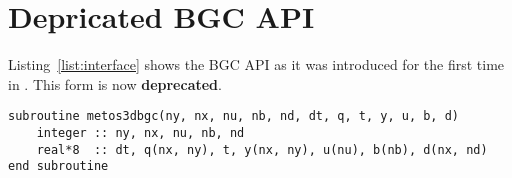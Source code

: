 \documentclass{article}
\begin{document}
%
%
%
%

%
%
%


%

\appendix

\section{Depricated BGC API}

Listing~\ref{list:interface} shows the BGC API as it was introduced
for the first time in \citep[][]{PiwSla16}. This form is now \textbf{deprecated}.


\lstset{language=[95]Fortran}
\begin{lstlisting}[float=*,
caption={Fortran 95 implementation of the coupling interface for biogeochemical models.},
label=list:interface,basicstyle=\ttfamily]
subroutine metos3dbgc(ny, nx, nu, nb, nd, dt, q, t, y, u, b, d)
    integer :: ny, nx, nu, nb, nd
    real*8  :: dt, q(nx, ny), t, y(nx, ny), u(nu), b(nb), d(nx, nd)
end subroutine
\end{lstlisting}
\end{document}

